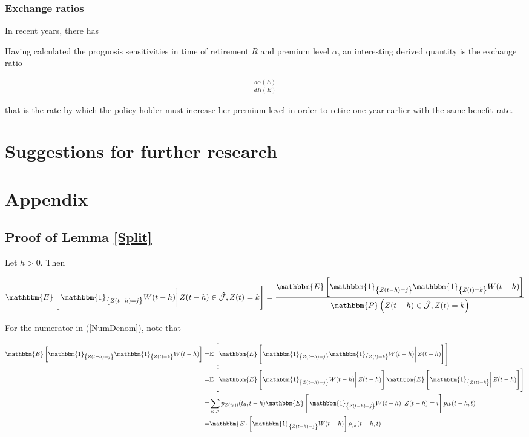\documentclass{book}
\newcommand{\1}[1]{\mathbbm{1}_{\left\lbrace #1 \right\rbrace}}
\newcommand{\expec}[1][def]{\mathbbm{E} \left[ #1 \right]}
\newcommand{\econd}[2][def]{\mathbbm{E} \left[ \left. #1 \right| #2 \right]}
\newcommand{\probability}[1][def]{\mathbbm{P} \left( #1 \right)}
\theoremstyle{break}
\theoremstyle{remark}
\numberwithin{equation}{section}
\begin{document}
\subsection{Exchange ratios}

In recent years, there has

Having calculated the prognosis sensitivities in time of retirement $R$ and premium level $\alpha$, an interesting derived quantity is the exchange ratio

\begin{align*}
	\frac{d \alpha (E)}{d R (E)}
\end{align*}

that is the rate by which the policy holder must increase her premium level in order to retire one year earlier with the same benefit rate. 

\chapter{Suggestions for further research}

\chapter{Appendix}

\section{Proof of Lemma \ref{Split}}

Let $h>0$. Then

\begin{align} \label{NumDenom}
	\econd[\1{Z(t-h)=j} W(t-h)]{Z(t-h) \in \hat{\mathcal{J}}, Z(t) = k} = \frac{\expec[\1{Z(t-h)=j} \1{Z(t)=k} W(t-h)]}{\probability[Z(t-h) \in \hat{\mathcal{J}}, Z(t)=k]}
\end{align}

For the numerator in (\ref{NumDenom}), note that 

\begin{align*}
	\expec[\1{Z(t-h)=j} \1{Z(t)=k} W(t-h)] =& \mathbb{E} \left[ \econd[\1{Z(t-h)=j} \1{Z(t)=k} W(t-h)]{Z(t-h)} \right] \\
	=& \mathbb{E} \left[ \econd[\1{Z(t-h)=j} W(t-h)]{Z(t-h)} \econd[\1{Z(t)=k}]{Z(t-h)} \right] \\
	=& \sum_{i \in \mathcal{J}} p_{Z(t_0)i}(t_0,t-h) \econd[\1{Z(t-h)=j} W(t-h)]{Z(t-h)=i} p_{ik}(t-h,t) \\
	=& \expec[\1{Z(t-h)=j} W(t-h)] p_{jk}(t-h,t)
\end{align*}
\end{document}
